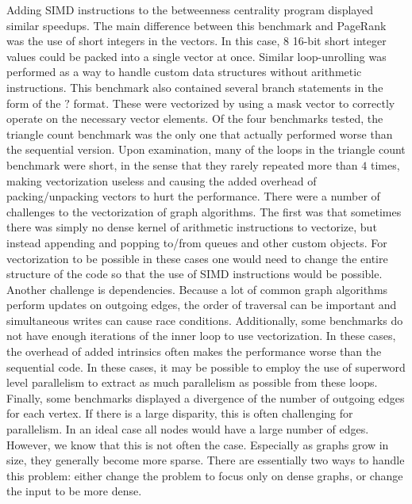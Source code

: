 \documentclass[conference]{IEEEtran}
\begin{document}
Adding SIMD instructions to the betweenness centrality program displayed similar speedups.  The main difference between this benchmark and PageRank was the use of short integers in the vectors.  In this case, 8 16-bit short integer values could be packed into a single vector at once.  Similar loop-unrolling was performed as a way to handle custom data structures without arithmetic instructions.  This benchmark also contained several branch statements in the form of the $?$ format.  These were vectorized by using a mask vector to correctly operate on the necessary vector elements.  Of the four benchmarks tested, the triangle count benchmark was the only one that actually performed worse than the sequential version.  Upon examination, many of the loops in the triangle count benchmark were short, in the sense that they rarely repeated more than $4$ times, making vectorization useless and causing the added overhead of packing/unpacking vectors to hurt the performance.  There were a number of challenges to the vectorization of graph algorithms.  The first was that sometimes there was simply no dense kernel of arithmetic instructions to vectorize, but instead appending and popping to/from queues and other custom objects.  For vectorization to be possible in these cases one would need to change the entire structure of the code so that the use of SIMD instructions would be possible.  Another challenge is dependencies.  Because a lot of common graph algorithms perform updates on outgoing edges, the order of traversal can be important and simultaneous writes can cause race conditions.  Additionally, some benchmarks do not have enough iterations of the inner loop to use vectorization.  In these cases, the overhead of added intrinsics often makes the performance worse than the sequential code.  In these cases, it may be possible to employ the use of superword level parallelism to extract as much parallelism as possible from these loops.  Finally, some benchmarks displayed a divergence of the number of outgoing edges for each vertex.  If there is a large disparity, this is often challenging for parallelism.  In an ideal case all nodes would have a large number of edges.  However, we know that this is not often the case.  Especially as graphs grow in size, they generally become more sparse.  There are essentially two ways to handle this problem: either change the problem to focus only on dense graphs, or change the input to be more dense.  
\end{document}
